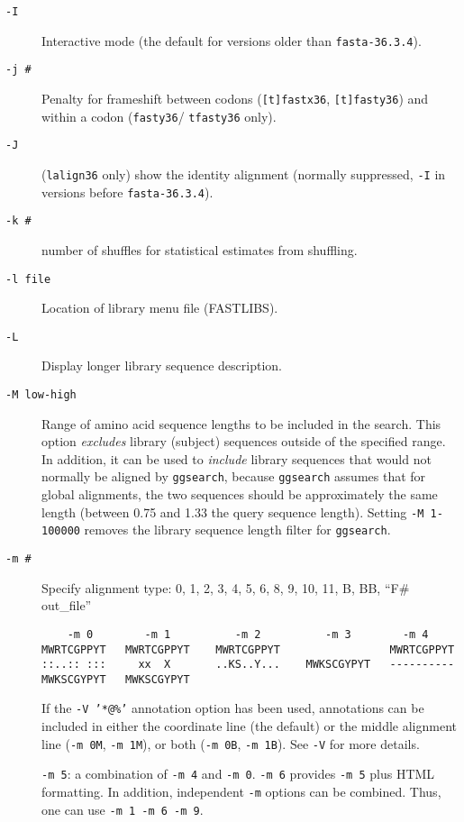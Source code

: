\documentclass[11pt]{article}
\begin{document}
\begin{description}
\item[\texttt{-I}]
Interactive mode (the default for versions older than \texttt{fasta-36.3.4}).
\item[\texttt{-j \#}]
Penalty for frameshift between codons (\texttt{[t]fastx36}, \texttt{[t]fasty36}) and within a codon (\texttt{fasty36}/ \texttt{tfasty36} only).
\item[\texttt{-J}]
(\texttt{lalign36} only) show the identity alignment (normally
  suppressed, \texttt{-I} in versions before \texttt{fasta-36.3.4}).
\item[\texttt{-k \#}]
number of shuffles for statistical estimates from shuffling.
\item[\texttt{-l file}]
Location of library menu file (FASTLIBS).
\item[\texttt{-L}]
Display longer library sequence description.
\item[\texttt{-M low-high}]
Range of amino acid sequence lengths to be included in the search.
This option \textit{excludes} library (subject) sequences outside of the specified
range.  In addition, it can be used to \textit{include} library
sequences that would not normally be aligned by \texttt{ggsearch},
because \texttt{ggsearch} assumes that for global alignments, the two
sequences should be approximately the same length (between 0.75 and
1.33 the query sequence length).  Setting \texttt{-M 1-100000} removes
the library sequence length filter for \texttt{ggsearch}.
\item[\texttt{-m \#}]
Specify alignment type: 0, 1, 2, 3, 4, 5, 6, 8, 9, 10, 11, B, BB, ``F\# out\_file''
\begin{small}
\begin{verbatim}
    -m 0        -m 1          -m 2          -m 3        -m 4
MWRTCGPPYT   MWRTCGPPYT    MWRTCGPPYT                 MWRTCGPPYT
::..:: :::     xx  X       ..KS..Y...    MWKSCGYPYT   ----------
MWKSCGYPYT   MWKSCGYPYT
\end{verbatim}
\end{small}
If the \texttt{-V '*@\%'} annotation option has been used, 
annotations can be included in either the coordinate line (the default) or the
middle alignment line (\texttt{-m 0M}, \texttt{-m 1M}), or both
(\texttt{-m 0B}, \texttt{-m 1B}).  See \texttt{-V} for more details.

\indent \texttt{-m 5}: a combination of \texttt{-m 4} and \texttt{-m
  0}. \texttt{-m 6} provides \texttt{-m 5} plus HTML formatting.  In
addition, independent \texttt{-m} options can be combined. Thus, one
can use \texttt{-m 1 -m 6 -m 9}.


\end{description}
\end{document}

